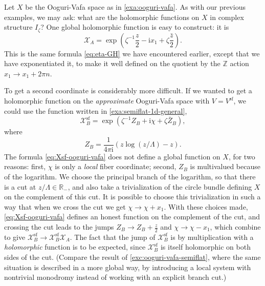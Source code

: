 \documentclass[12pt,letterpaper,reqno]{article}
\numberwithin{equation}{section}
\newcommand{\cX}{\ensuremath{\mathcal X}}
\newcommand{\R}{\ensuremath{\mathbb R}}
\newcommand{\Z}{\ensuremath{\mathbb Z}}
\newcommand{\I}{{\mathrm i}}
\renewcommand{\sf}{\mathrm{sf}}
\newcommand{\ti}[1]{\textit{#1}}
\begin{document}
\begin{example}
Let $X$ be the Ooguri-Vafa space as in \autoref{exa:ooguri-vafa}.
As with our previous examples, we may ask: what are the holomorphic
functions on $X$ in complex structure $I_\zeta$?
One global holomorphic function is easy to construct: it is
\begin{equation}
  \cX_A = \exp \left(\zeta^{-1} \frac{z}{2} - \I x_1 + \zeta \frac{\bar{z}}{2}\right).
\end{equation}
This is the same formula \eqref{eq:eta-GH} we have encountered
earlier, except that we have exponentiated it, to make it well defined
on the quotient by the $\Z$ action $x_1 \to x_1 + 2 \pi n$.

To get a second coordinate is considerably more difficult.
If we wanted to get a holomorphic function on the \ti{approximate}
Ooguri-Vafa space with $V = V^\sf$,
we could use the function written
in \autoref{exa:semiflat-1d-general},
\begin{equation} \label{eq:Xsf-ooguri-vafa}
  \cX_B^{\sf} = \exp \left(\zeta^{-1} Z_B + \I \chi + \zeta \bar{Z}_B \right),
\end{equation}
where
\begin{equation}
  Z_B = \frac{1}{4 \pi \I} (z \log (z/\Lambda) - z).
\end{equation}
The formula \eqref{eq:Xsf-ooguri-vafa} does not define a global
function on $X$, for two reasons: first, $\chi$ is only a \ti{local} fiber
coordinate; second, $Z_B$ is multivalued because of the logarithm.
We choose the principal branch of the logarithm, so that there
is a cut at $z / \Lambda \in \R_-$, and also take a trivialization
of the circle bundle defining $X$ on the complement of this cut.
It is possible to choose this trivialization in such a way that
when we cross the cut we get $\chi \to \chi + x_1$.
With these choices made, \eqref{eq:Xsf-ooguri-vafa} defines
an honest function on the complement of the cut, and crossing
the cut leads to the jumps $Z_B \to Z_B + \frac{z}{2}$
and $\chi \to \chi - x_1$,
which combine to give $\cX_B^\sf \to \cX_B^\sf \cX_A$.
The fact that the jump of $\cX_B^\sf$ is by multiplication with a
\ti{holomorphic} function is to be expected, since $\cX_B^\sf$
is itself holomorphic on both sides of the cut.
(Compare the result of \autoref{exc:ooguri-vafa-semiflat}, where
the same situation is described in a more global way, by introducing
a local system with nontrivial monodromy instead of working
with an explicit branch cut.)


\end{example}
\end{document}
